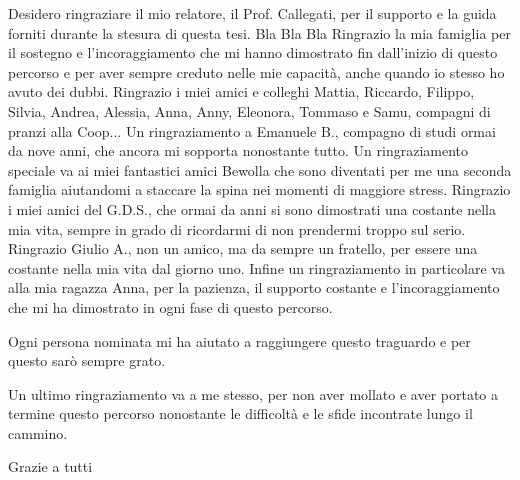 \documentclass[12pt,a4paper,openright,twoside]{book}
\begin{document}
\begin{acknowledgements} %
    Desidero ringraziare il mio relatore, il Prof. Callegati, per il supporto e la guida forniti durante la stesura di questa tesi. Bla Bla Bla
    Ringrazio la mia famiglia per il sostegno e l'incoraggiamento che mi hanno dimostrato fin dall'inizio di questo percorso e per aver sempre creduto nelle mie capacità, anche quando io stesso ho avuto dei dubbi.
    Ringrazio i miei amici e colleghi Mattia, Riccardo, Filippo, Silvia, Andrea, Alessia, Anna, Anny, Eleonora, Tommaso e Samu, compagni di pranzi alla Coop... 
    Un ringraziamento a Emanuele B., compagno di studi ormai da nove anni, che ancora mi sopporta nonostante tutto.
    Un ringraziamento speciale va ai miei fantastici amici Bewolla che sono diventati per me una seconda famiglia aiutandomi a staccare la spina nei momenti di maggiore stress.
    Ringrazio i miei amici del G.D.S., che ormai da anni si sono dimostrati una costante nella mia vita, sempre in grado di ricordarmi di non prendermi troppo sul serio.
    Ringrazio Giulio A., non un amico, ma da sempre un fratello, per essere una costante nella mia vita dal giorno uno.
    Infine un ringraziamento in particolare va alla mia ragazza Anna, per la pazienza, il supporto costante e l’incoraggiamento che mi ha dimostrato in ogni fase di questo percorso.

    Ogni persona nominata mi ha aiutato a raggiungere questo traguardo e per questo sarò sempre grato.

    Un ultimo ringraziamento va a me stesso, per non aver mollato e aver portato a termine questo percorso nonostante le difficoltà e le sfide incontrate lungo il cammino.

    Grazie a tutti
\end{acknowledgements}
\end{document}
